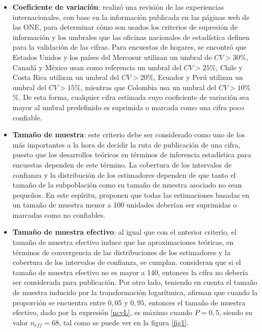 \documentclass[12pt,spanish,]{book}
\providecommand{\tightlist}{%
  \setlength{\itemsep}{0pt}\setlength{\parskip}{0pt}}
\begin{document}
\begin{itemize}
\tightlist
\item
  \textbf{Coeficiente de variación}: \textcite{CepalSAe2018} realizó una revisión de las experiencias internacionales, con base en la información publicada en las páginas web de las ONE, para determinar cómo son usados los criterios de supresión de información y los umbrales que las oficinas nacionales de estadística definen para la validación de las cifras. Para encuestas de hogares, se encontró que Estados Unidos y los países del Mercosur utilizan un umbral de \(CV > 30\%\), Canadá y México usan como referencia un umbral del \(CV > 25\%\), Chile y Costa Rica utilizan un umbral del \(CV > 20\%\), Ecuador y Perú utilizan un umbral del \(CV > 15\%\), mientras que Colombia usa un umbral del \(CV > 10\%\)\%. De esta forma, cualquier cifra estimada cuyo coeficiente de variación sea mayor al umbral predefinido es suprimida o marcada como una cifra poco confiable.
\item
  \textbf{Tamaño de muestra}: este criterio debe ser considerado como uno de los más importantes a la hora de decidir la ruta de publicación de una cifra, puesto que los desarrollos teóricos en términos de inferencia estadística para encuestas dependen de este término. La cobertura de los intervalos de confianza y la distribución de los estimadores dependen de que tanto el tamaño de la subpoblación como su tamaño de muestra asociado no sean pequeños. En este espíritu, \textcite{Barnett_Walker_Chromy_Davis_Emrich_Odom_Packer_2003} proponen que todas las estimaciones basadas en un tamaño de muestra menor a 100 unidades deberían ser suprimidas o marcadas como no confiables.
\item
  \textbf{Tamaño de muestra efectivo}: al igual que con el anterior criterio, el tamaño de muestra efectivo induce que las aproximaciones teóricas, en términos de convergencia de las distribuciones de los estimadores y la cobertura de los intervalos de confianza, se cumplan. \textcite{Hornik_Maklan_Cadell_Prado_Barmada_Jacobsohn_Orwin_Sridharan_Zador_Southwell_etal} consideran que si el tamaño de muestra efectivo no es mayor a 140, entonces la cifra no debería ser considerada para publicación. Por otro lado, teniendo en cuenta el tamaño de muestra inducido por la transformación logarítmica, \textcite{Barnett_Walker_Chromy_Davis_Emrich_Odom_Packer_2003} afirman que cuando la proporción se encuentra entre \(0,05\) y \(0,95\), entonces el tamaño de muestra efectivo, dado por la expresión \eqref{ncvL}, es máximo cuando \(P = 0,5\), siendo su valor \(n_{eff} = 68\), tal como se puede ver en la figura \ref{fig1}.

\end{itemize}
\end{document}
